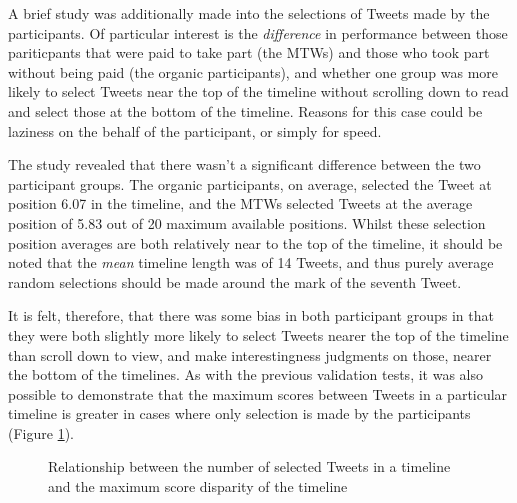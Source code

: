 A brief study was additionally made into the selections of Tweets made by the participants. Of particular interest is the \textit{difference} in performance between those pariticpants that were paid to take part (the MTWs) and those who took part without being paid (the organic participants), and whether one group was more likely to select Tweets near the top of the timeline without scrolling down to read and select those at the bottom of the timeline. Reasons for this case could be laziness on the behalf of the participant, or simply for speed.

The study revealed that there wasn't a significant difference between the two participant groups. The organic participants, on average, selected the Tweet at position 6.07 in the timeline, and the MTWs selected Tweets at the average position of 5.83 out of 20 maximum available positions.
Whilst these selection position averages are both relatively near to the top of the timeline, it should be noted that the \textit{mean} timeline length was of 14 Tweets, and thus purely average random selections should be made around the mark of the seventh Tweet.

It is felt, therefore, that there was some bias in both participant groups in that they were both slightly more likely to select Tweets nearer the top of the timeline than scroll down to view, and make interestingness judgments on those, nearer the bottom of the timelines. As with the previous validation tests, it was also possible to demonstrate that the maximum scores between Tweets in a particular timeline is greater in cases where only selection is made by the participants (Figure \ref{fig:disparity-2}). 

\begin{figure}
    \centering
\label{fig:disparity-2}
\caption{Relationship between the number of selected Tweets in a timeline and the maximum score disparity of the timeline}
\end{figure}


